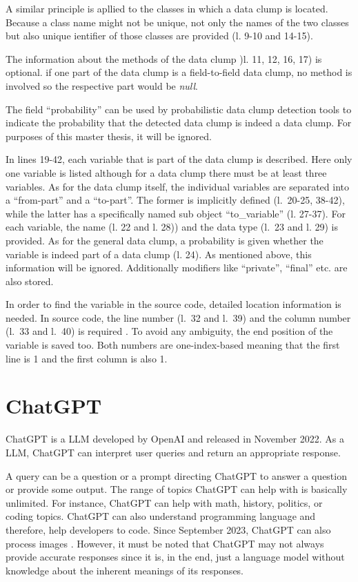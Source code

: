 A similar principle is apllied to the classes in which a data clump is located. Because a class name might not be unique, not only the names of the two classes but also unique ientifier of those classes are provided (l. 9-10 and 14-15).

The information about the methods of the data clump )l. 11, 12, 16, 17) is optional. if one part of the data clump is a field-to-field data clump, no method is involved so the respective part would be \textit{null}.

The field \enquote{probability} can be used by probabilistic data clump detection tools to indicate the probability that the detected data clump is indeed a data clump. For purposes of this master thesis, it will be ignored. 

In lines 19-42, each variable that is part of the data clump is  described. Here only one variable is listed although for a data clump there must be at least three variables. As for the data clump itself, the individual variables are separated into  a \enquote{from-part} and a \enquote{to-part}. The former is implicitly defined (l.~20-25, 38-42), while the latter has a specifically named sub object \enquote{to\_variable} (l. 27-37). For each variable, the name (l. 22 and l. 28)) and the data type (l.~23 and l. 29) is provided. As for the general data clump, a probability is given whether the variable is indeed part of a data clump (l. 24). As mentioned above, this information will be ignored.  Additionally modifiers like \enquote{private}, \enquote{final} etc. are also stored. 

In order to find the variable in the source code, detailed location information is needed. In source code, the line number (l.~32 and l.~39) and the column number (l.~33 and l.~40) is required . To avoid any ambiguity, the end position of the variable is saved too. Both numbers are one-index-based meaning that the first line is 1 and the first column is also 1. 


\section{ChatGPT}\label{sec:chatgpt}

ChatGPT \cite{ChatGPT_url} is a \ac{LLM} developed by OpenAI and released in November 2022. As a \ac{LLM}, ChatGPT can interpret user queries and return an appropriate response. 

A query can be a question or a prompt directing ChatGPT to answer a question or provide some output. The range of topics ChatGPT can help with is basically unlimited. For instance, ChatGPT can help with math, history, politics, or coding topics. ChatGPT can also understand programming language and therefore, help developers to code. Since September 2023, ChatGPT can also process images \cite{ChatGPT_image}. However, it must be noted that ChatGPT may not always provide accurate responses since it is, in the end, just a language model without knowledge about the inherent meanings of its responses. 

